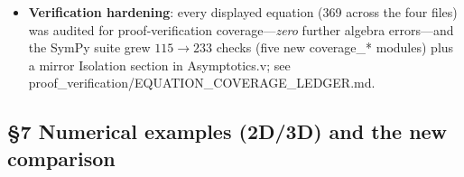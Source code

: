 \documentclass[11pt]{article}
\newcommand{\code}[1]{\textcolor{newc}{\ttfamily\small #1}}
\newcommand{\artl}[1]{art.\ L#1}       %
\begin{document}
\begin{itemize}
  benchmark''; \textbf{N15} (\artl{1163}) OSGS ``error component''$\to$``quadratic excess indicator'';
  \textbf{N19} (\artl{1428}) ``genuinely 3D test''$\to$``3D \emph{discretization} test'';
  \textbf{N13} (\artl{1654}) ``corroborated''$\to$``consistent with''; \textbf{S03}/\textbf{S07} source/caption.
\item \textbf{Verification hardening}: every displayed equation (369 across the four files) was audited for
  proof-verification coverage---\emph{zero} further algebra errors---and the SymPy suite grew $115\!\to\!233$
  checks (five new \code{coverage\_*} modules) plus a mirror \code{Isolation} section in \code{Asymptotics.v};
  see \code{proof\_verification/EQUATION\_COVERAGE\_LEDGER.md}.
\end{itemize}

\subsection{\S7 Numerical examples (2D/3D) and the new comparison}
\end{document}
